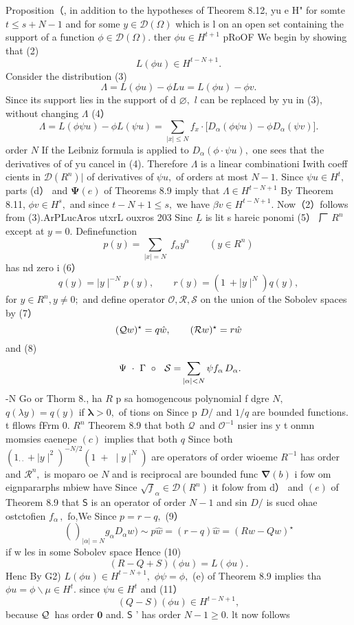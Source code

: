 Proposition（, in addition to the hypotheses of Theorem 8.12, yu e H" for somte $t\leq s+N-1$ and for some $y\in{\mathcal{D}}(\Omega)$ which is l on an open set containing the support of a function $\phi\in{\mathcal{D}}(\Omega).$ ther $\phi u\in H^{t+1}$ pRoOF We begin by showing that (2) $$ L(\phi u)\in H^{t-N+1}. $$ Consider the distribution (3) $$ \Lambda=L(\phi u)-\phi L u=L(\phi u)-\phi v. $$ Since its support lies in the support of d $\varnothing,$ $\boldsymbol{\mathit{l}}$ can be replaced by yu in (3), without changing $\Lambda$ (4） $$ \Lambda=L(\phi\psi u)-\phi L(\psi u)=\sum_{\mid x\mid\leq N}f_{x}\cdot \lbrack D_{\alpha}(\phi\psi u)-\phi D_{\alpha}(\psi v) \rbrack. $$ order $\textstyle N$ If the Leibniz formula is applied to $D_{\alpha}(\phi\cdot\psi u),$ one sees that the derivatives of of yu cancel in (4). Therefore $\Lambda$ is a linear combinationi Iwith coeff cients in ${\mathcal{D}}(R^{n})|$ of derivatives of $\textstyle\psi u,$ of orders at most $N-1.$ Since $\psi u\in H^{t},$ parts (d） and $\mathbf{\Psi}(e)$ of Theorems 8.9 imply that $\Lambda\in H^{t-N+1}$ By Theorem 8.11, $\phi v\in H^{s},$ and since $t-N+1\leq s,$ we have $\beta v\in H^{t-N+1}.$ Now（2）follows from (3).ArPLucAros utxrL ouxros 203 Sinc $\underline{{L}}$ is lit s hareic ponomi (5） 厂 $\textstyle R^{n}\!\!$ except at $y=0.$ Definefunction $$ p(y)=\sum_{|x|=N}\;f_{\alpha}y^{\alpha}\qquad(y\in R^{n}) $$ has nd zero i (6） $$ q(y)=\mid y\mid^{-N}p(y),\qquad r(y)=(1\ +\mid y\mid^{N})q(y), $$ for $y\in R^{n},y\neq0;$ and define operator ${\mathcal{O}},{\mathcal{R}},{\mathcal{S}}$ on the union of the Sobolev spaces by (7） $$ ({\cal Q}{\mit w})^{\star}=q{\hat{w}},\qquad({\cal R}{\mit w})^{\star}=r{\hat{w}} $$ and (8) $$ \mathrm{\boldmath~\Psi~}\cdot\mathrm{\boldmath~\Gamma~}\circ\mathrm{\boldmath~\cal~S=}\sum_{|\alpha|<N}\psi f_{\alpha}\,D_{\alpha}. $$ -N Go or Thorm 8., ha $\textstyle R$ p sa homogencous polynomial f dgre $N,$ $q(\lambda y)=q(y)$ if ${\boldsymbol{\lambda}}>0,$ of tions on Since p $D\!\!\!\!/$ and $1/q$ are bounded functions. t fllows fFrm $0.$ $\textstyle R^{n}$ Theorem 8.9 that both ${\mathcal Q}\,$ and ${\mathcal{O}}^{-1}$ nsier ins y t onmn momsies eaenepe $\left(c\right)$ implies that both $\boldsymbol{\mathit{q}}$ Since both $(1_{\cdot\cdot}+\mid y\mid^{2})^{-N/2}(1\;+\;\mid y\mid^{N})$ are operators of order wioeme $R^{-1}$ has order and $\textstyle{\mathcal{R}}^{n},$ is moparo oe $\textstyle N$ and is reciprocal are bounded func $\mathbf{\nabla}(b)$ i fow om eignpararphs mbiew have Since $\textstyle\sqrt{f}_{\alpha}\in{\mathcal{D}}(R^{n})$ it folow from d） and $(e)$ of Theorem 8.9 that $\boldsymbol{\mathsf{S}}$ is an operator of order $N-1$ and sin $D\!\!\!\!/$ is sucd ohae ostctofien $f_{\alpha}\,,$ fo,We Since $p=r-q,$ (9） $$ {\binom{}{}_{|\alpha|=N}}g_{\alpha}D_{\alpha}w\Big)\sim p{\hat{w}}=(r-q){\hat{w}}=(R w-Q w)^{\star} $$ if w les in some Sobolev space Hence (10) $$ (R-Q+S)(\phi u)=L(\phi u). $$ Henc By G2) $L(\phi u)\in H^{t-N+1},$ $\phi\psi=\phi,$ (e) of Theorem 8.9 implies tha $\phi u=\phi\backslash\mu\in H^{t}.$ since $\psi u\in H^{t}$ and (11） $$ (Q-S)(\phi u)\in H^{t-N+1}, $$ because ${\cal Q}\,$ has order ${\boldsymbol{0}}$ and. $\boldsymbol{\mathsf{S}}$ ' has order $N-1\geq0.$ lt now follows 